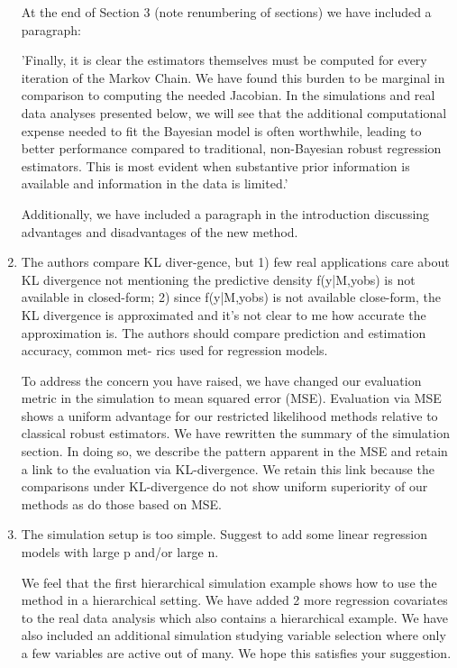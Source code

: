 \documentclass{article}
\newcommand{\response}[1]{{\color{blue}#1}}
\begin{document}
\begin{enumerate}
\response{At the end of Section 3 (note renumbering of sections) we have included a paragraph:}

\response{'Finally, it is clear the estimators themselves must be computed for every iteration of the Markov Chain. We have found this burden to be marginal in comparison to computing the needed Jacobian. In the simulations and real data analyses presented below, we will see that the additional computational expense needed to fit the Bayesian model is often worthwhile, leading to better performance compared to traditional, non-Bayesian robust regression estimators.  This is most evident when substantive prior information is available and information in the data is limited.'}

\response{Additionally, we have included a paragraph in the introduction discussing advantages and disadvantages of the new method.}

\item The authors compare KL diver-gence, but 1) few real applications care about KL divergence not mentioning the predictive density f(y|M,yobs) is not available in closed-form; 2) since f(y|M,yobs) is not available close-form, the KL divergence is approximated and it's not clear to me how accurate the approximation is.
The authors should compare prediction and estimation accuracy, common met- rics used for regression models.

\response{To address the concern you have raised, we have changed our evaluation metric in the simulation to mean squared error (MSE).  Evaluation via MSE shows a uniform advantage for our restricted likelihood methods relative to classical robust estimators.  We have rewritten the summary of the simulation section.  In doing so, we describe the pattern apparent in the MSE and retain a link to the evaluation via KL-divergence.  We retain this link because the comparisons under KL-divergence do not show uniform superiority of our methods as do those based on MSE.}

\item The simulation setup is too simple. Suggest to add some linear regression models with large p and/or large n.

\response{We feel that the first hierarchical simulation example shows how to use the method in a hierarchical setting. We have added 2 more regression covariates to the real data analysis which also contains a hierarchical example. We have also included an additional simulation studying variable selection where only a few variables are active out of many.  We hope this satisfies your suggestion.}

\end{enumerate}
\end{document}
